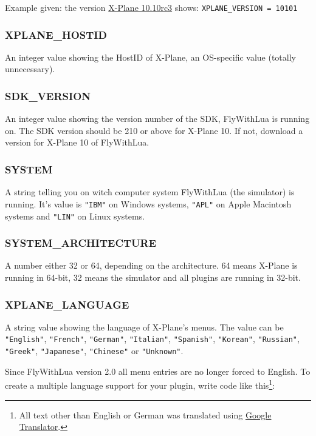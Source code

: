 \documentclass[11pt,parskip=half,a4paper]{scrartcl}
\begin{document}
Example given: the version \href{http://wiki.x-plane.com/Beta#X-Plane_10.10_RC_3}{X-Plane 10.10rc3} shows: \verb|XPLANE_VERSION = 10101|

\subsubsection{XPLANE\_HOSTID}

An integer value showing the HostID of X-Plane, an OS-specific value (totally unnecessary).

\subsubsection{SDK\_VERSION}

An integer value showing the version number of the SDK, FlyWithLua is running on. The SDK version should be 210 or above for X-Plane 10. If not, download a version for X-Plane 10 of FlyWithLua.

\subsubsection{SYSTEM}

A string telling you on witch computer system FlyWithLua (the simulator) is running. It's value is \verb|"IBM"| on Windows systems, \verb|"APL"| on Apple Macintosh systems and \verb|"LIN"| on Linux systems.

\subsubsection{SYSTEM\_ARCHITECTURE}

A number either 32 or 64, depending on the architecture. 64 means X-Plane is running in 64-bit, 32 means the simulator and all plugins are running in 32-bit.

\subsubsection{XPLANE\_LANGUAGE}

A string value showing the language of X-Plane's menus. The value can be \verb|"English"|, \verb|"French"|, \verb|"German"|, \verb|"Italian"|, \verb|"Spanish"|, \verb|"Korean"|, \verb|"Russian"|, \verb|"Greek"|, \verb|"Japanese"|, \verb|"Chinese"| or \verb|"Unknown"|.

\newpage
Since FlyWithLua version 2.0 all menu entries are no longer forced to English. To create a multiple language support for your plugin, write code like this\footnote{All text other than English or German was translated using \href{http://translate.google.com/}{Google Translator}.}:
\end{document}
